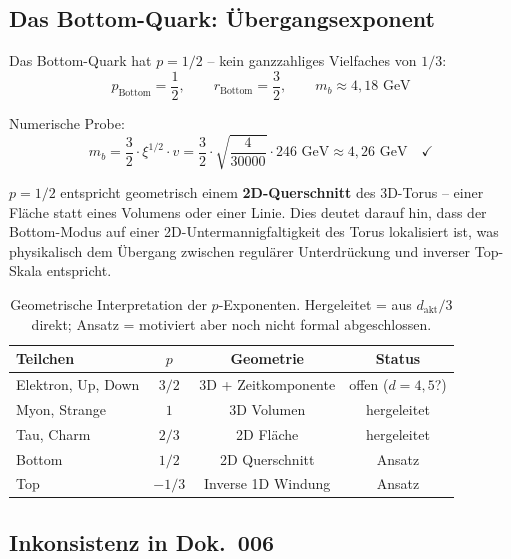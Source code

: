 \subsection{Das Bottom-Quark: Übergangsexponent}

Das Bottom-Quark hat $p = 1/2$ -- kein ganzzahliges Vielfaches
von $1/3$:
\begin{equation}
    p_{\text{Bottom}} = \frac{1}{2}, \qquad
    r_{\text{Bottom}} = \frac{3}{2}, \qquad
    m_b \approx 4{,}18 \text{ GeV}
\end{equation}

Numerische Probe:
\begin{equation}
    m_b = \frac{3}{2} \cdot \xi^{1/2} \cdot v
    = \frac{3}{2} \cdot \sqrt{\frac{4}{30000}} \cdot 246 \text{ GeV}
    \approx 4{,}26 \text{ GeV} \quad \checkmark
\end{equation}

$p = 1/2$ entspricht geometrisch einem \textbf{2D-Querschnitt} des
3D-Torus -- einer Fläche statt eines Volumens oder einer Linie.
Dies deutet darauf hin, dass der Bottom-Modus auf einer 2D-Untermannigfaltigkeit
des Torus lokalisiert ist, was physikalisch dem Übergang zwischen
regulärer Unterdrückung und inverser Top-Skala entspricht.

\begin{table}[htbp]
\centering\small
\begin{tabular}{lccc}
\toprule
\textbf{Teilchen} & $p$ & \textbf{Geometrie} & \textbf{Status} \\
\midrule
Elektron, Up, Down & $3/2$ & 3D + Zeit\-komponente & offen ($d=4{,}5$?) \\
Myon, Strange      & $1$   & 3D Volumen          & hergeleitet \\
Tau, Charm         & $2/3$ & 2D Fläche           & hergeleitet \\
Bottom             & $1/2$ & 2D Querschnitt      & Ansatz \\
Top                & $-1/3$& Inverse 1D Windung  & Ansatz \\
\bottomrule
\end{tabular}
\caption{Geometrische Interpretation der $p$-Exponenten.
Hergeleitet = aus $d_{\text{akt}}/3$ direkt; Ansatz = motiviert
aber noch nicht formal abgeschlossen.}
\label{tab:p_geometrie}
\end{table}

\subsection{Inkonsistenz in Dok.~006}

